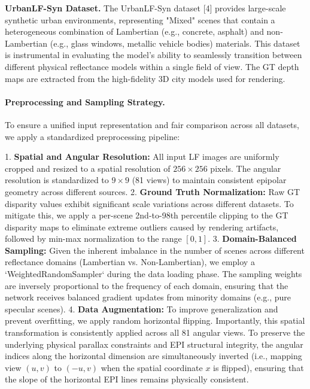 \textbf{UrbanLF-Syn Dataset.} The UrbanLF-Syn dataset [4] provides large-scale synthetic urban environments, representing "Mixed" scenes that contain a heterogeneous combination of Lambertian (e.g., concrete, asphalt) and non-Lambertian (e.g., glass windows, metallic vehicle bodies) materials. This dataset is instrumental in evaluating the model's ability to seamlessly transition between different physical reflectance models within a single field of view. The GT depth maps are extracted from the high-fidelity 3D city models used for rendering.

\paragraph{Preprocessing and Sampling Strategy.}

To ensure a unified input representation and fair comparison across all datasets, we apply a standardized preprocessing pipeline:

1. \textbf{Spatial and Angular Resolution:} All input LF images are uniformly cropped and resized to a spatial resolution of $256 \times 256$ pixels. The angular resolution is standardized to $9 \times 9$ (81 views) to maintain consistent epipolar geometry across different sources.
2. \textbf{Ground Truth Normalization:} Raw GT disparity values exhibit significant scale variations across different datasets. To mitigate this, we apply a per-scene 2nd-to-98th percentile clipping to the GT disparity maps to eliminate extreme outliers caused by rendering artifacts, followed by min-max normalization to the range $[0, 1]$.
3. \textbf{Domain-Balanced Sampling:} Given the inherent imbalance in the number of scenes across different reflectance domains (Lambertian vs. Non-Lambertian), we employ a `WeightedRandomSampler` during the data loading phase. The sampling weights are inversely proportional to the frequency of each domain, ensuring that the network receives balanced gradient updates from minority domains (e.g., pure specular scenes).
4. \textbf{Data Augmentation:} To improve generalization and prevent overfitting, we apply random horizontal flipping. Importantly, this spatial transformation is consistently applied across all 81 angular views. To preserve the underlying physical parallax constraints and EPI structural integrity, the angular indices along the horizontal dimension are simultaneously inverted (i.e., mapping view $(u, v)$ to $(-u, v)$ when the spatial coordinate $x$ is flipped), ensuring that the slope of the horizontal EPI lines remains physically consistent.

